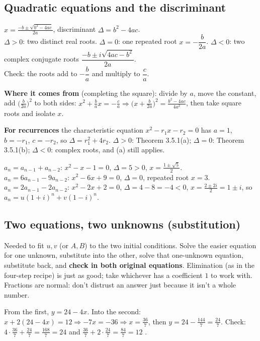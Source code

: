 \documentclass{fkt-notes}
\theoremstyle{definition}
\begin{document}
\subsection*{Quadratic equations and the discriminant}\label{qg:quad}
%
\begin{rulebox}[title={$ax^2+bx+c=0$, \ $a\neq0$}]
  $\displaystyle x=\frac{-b\pm\sqrt{b^2-4ac}}{2a}$, \quad discriminant
  $\Delta=b^2-4ac$.\\[3pt]
  $\Delta>0$: two distinct real roots. \quad $\Delta=0$: one repeated root
  $x=-\dfrac b{2a}$. \quad $\Delta<0$: two complex conjugate roots
  $\dfrac{-b\pm i\sqrt{4ac-b^2}}{2a}$.\\[3pt]
  Check: the roots add to $-\dfrac ba$ and multiply to $\dfrac ca$.
\end{rulebox}
\textbf{Where it comes from} (completing the square): divide by $a$, move the
constant, add $\bigl(\frac b{2a}\bigr)^2$ to both sides:
$x^2+\frac bax=-\frac ca\Rightarrow\bigl(x+\frac b{2a}\bigr)^2=\frac{b^2-4ac}{4a^2}$,
then take square roots and isolate $x$.

\textbf{For recurrences} the characteristic equation $x^2-r_1x-r_2=0$ has
$a=1$, $b=-r_1$, $c=-r_2$, so $\Delta=r_1^2+4r_2$. $\Delta>0$: Theorem
3.5.1(a); $\Delta=0$: Theorem 3.5.1(b); $\Delta<0$: complex roots, and
(a) still applies.
\begin{example}
  $a_n=a_{n-1}+a_{n-2}$: $x^2-x-1=0$, $\Delta=5>0$, $x=\frac{1\pm\sqrt5}2$.\\
  $a_n=6a_{n-1}-9a_{n-2}$: $x^2-6x+9=0$, $\Delta=0$, repeated root $x=3$.\\
  $a_n=2a_{n-1}-2a_{n-2}$: $x^2-2x+2=0$, $\Delta=4-8=-4<0$,
  $x=\frac{2\pm2i}2=1\pm i$, so $a_n=u(1+i)^n+v(1-i)^n$.
\end{example}

\subsection*{Two equations, two unknowns (substitution)}
%
\begin{rulepar}
  Needed to fit $u,v$ (or $A,B$) to the two initial conditions. Solve the
  easier equation for one unknown, substitute into the other, solve that
  one-unknown equation, substitute back, and \textbf{check in both original
    equations}. Elimination (as in the four-step recipe) is just as good;
  take whichever has a coefficient $1$ to work with. Fractions are normal:
  don't distrust an answer just because it isn't a whole number.
\end{rulepar}
\begin{example}[$4x+y=24$, \ $x+2y=12$]
  From the first, $y=24-4x$. Into the second: $x+2(24-4x)=12\Rightarrow
  -7x=-36\Rightarrow x=\frac{36}7$, then $y=24-\frac{144}7=\frac{24}7$.
  Check: $4\cdot\frac{36}7+\frac{24}7=\frac{168}7=24$ and
  $\frac{36}7+2\cdot\frac{24}7=\frac{84}7=12$ \checkmark.
\end{example}
\end{document}
